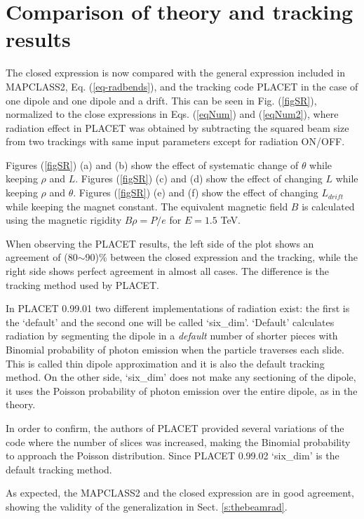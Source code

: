 \section{Comparison of theory and tracking results}\label{s:comparison}
The closed expression is now compared with the general expression included in MAPCLASS2, Eq. (\ref{eq-radbends}), and the tracking code PLACET in the case of one dipole and one dipole and a drift. This can be seen in Fig. (\ref{figSR}), normalized to the close expressions in Eqs. (\ref{eqNum}) and (\ref{eqNum2}), where radiation effect in PLACET was obtained by subtracting the squared beam size from two trackings with same input parameters except for radiation ON/OFF.\par
Figures (\ref{figSR}) (a) and (b) show the effect of systematic change of $\theta$ while keeping $\rho$ and $L$. Figures (\ref{figSR}) (c) and (d) show the effect of changing $L$ while keeping $\rho$ and $\theta$. Figures (\ref{figSR}) (e) and (f) show the effect of changing $L_{drift}$ while keeping the magnet constant. The equivalent magnetic field $B$ is calculated using the magnetic rigidity $B\rho=P/e$ for $E=1.5 $ TeV.\par
When observing the PLACET results, the left side of the plot shows an agreement of (80$\sim$90)\% between the closed expression and the tracking, while the right side shows perfect agreement in almost all cases. The difference is the tracking method used by PLACET.\par
In PLACET 0.99.01 two different implementations of radiation exist: the first is the `default' and the second one will be called  `six\_dim'. `Default' calculates radiation by segmenting the dipole in a \emph{default} number of shorter pieces with Binomial probability of photon emission when the particle traverses each slide. This is called thin dipole approximation and it is also the default tracking method. On the other side, `six\_dim' does not make any sectioning of the dipole, it uses the Poisson probability of photon emission over the entire  dipole, as in the theory.\par
In order to confirm, the authors of PLACET provided several variations of the code where the number of slices was increased, making the Binomial probability to approach the Poisson distribution. Since PLACET 0.99.02 `six\_dim' is the default tracking method.\par
As expected, the MAPCLASS2 and the closed expression are in good agreement, showing the validity of the generalization in Sect. \ref{s:thebeamrad}. %

